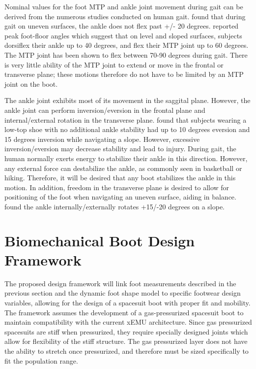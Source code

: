 \documentclass[defaultstyle,11pt]{comps}
\begin{document}
Nominal values for the foot MTP and ankle joint movement during gait can be derived from the numerous studies conducted on human gait.
\citep{Voloshina2013} found that during gait on uneven surfaces, the ankle does not flex past +/- 20 degrees.
\citep{Wannop2014} reported peak foot-floor angles which suggest that on level and sloped surfaces, subjects dorsiflex their ankle up to 40 degrees, and flex their MTP joint up to 60 degrees.
The MTP joint has been shown to flex between 70-90 degrees during gait\citep{Mann1979}.
There is very little ability of the MTP joint to extend or move in the frontal or transverse plane\citep{Mann1979}; these motions therefore do not have to be limited by an MTP joint on the boot.

The ankle joint exhibits most of its movement in the saggital plane.
However, the ankle joint can perform inversion/eversion in the frontal plane and internal/external rotation in the transverse plane.
\citep{Wannop2014} found that subjects wearing a low-top shoe with no additional ankle stability had up to 10 degrees eversion and 15 degrees inversion while navigating a slope.
However, excessive inversion/eversion may decrease stability and lead to injury.
During gait, the human normally exerts energy to stabilize their ankle in this direction\citep{OLoughlin2009}.
However, any external force can destabilize the ankle, as commonly seen in basketball or hiking\citep{Bohm2010}.
Therefore, it will be desired that any boot stabilizes the ankle in this motion.
In addition, freedom in the transverse plane is desired to allow for positioning of the foot when navigating an uneven surface, aiding in balance\citep{Wannop2014, Fraser2016a}.
\citep{Wannop2014} found the ankle internally/externally rotates +15/-20 degrees on a slope.

\hypertarget{biomechanical-boot-design-framework}{%
\section{Biomechanical Boot Design Framework}\label{biomechanical-boot-design-framework}}

The proposed design framework will link foot measurements described in the previous section and the dynamic foot shape model to specific footwear design variables, allowing for the design of a spacesuit boot with proper fit and mobility.
The framework assumes the development of a gas-pressurized spacesuit boot to maintain compatibility with the current xEMU architecture.
Since gas pressurized spacesuits are stiff when pressurized, they require specially designed joints which allow for flexibility of the stiff structure.
The gas pressurized layer does not have the ability to stretch once pressurized, and therefore must be sized specifically to fit the population range.
\end{document}
